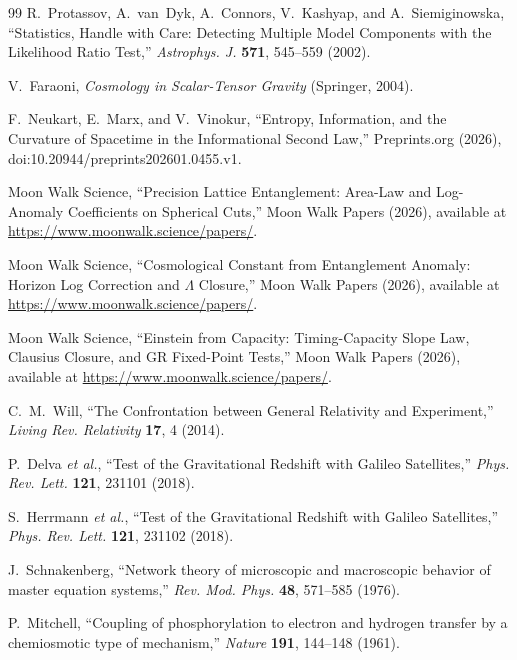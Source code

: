 \documentclass[10pt]{article}
\begin{document}
\begin{thebibliography}{99}
R.~Protassov, A.~van~Dyk, A.~Connors, V.~Kashyap, and A.~Siemiginowska,
``Statistics, Handle with Care: Detecting Multiple Model Components with the Likelihood Ratio Test,''
\emph{Astrophys. J.} \textbf{571}, 545--559 (2002).

V.~Faraoni,
\emph{Cosmology in Scalar-Tensor Gravity}
(Springer, 2004).

F.~Neukart, E.~Marx, and V.~Vinokur,
``Entropy, Information, and the Curvature of Spacetime in the Informational Second Law,''
Preprints.org (2026), doi:10.20944/preprints202601.0455.v1.

Moon Walk Science,
``Precision Lattice Entanglement: Area-Law and Log-Anomaly Coefficients on Spherical Cuts,''
Moon Walk Papers (2026), available at
\url{https://www.moonwalk.science/papers/}.

Moon Walk Science,
``Cosmological Constant from Entanglement Anomaly: Horizon Log Correction and \(\Lambda\) Closure,''
Moon Walk Papers (2026), available at
\url{https://www.moonwalk.science/papers/}.

Moon Walk Science,
``Einstein from Capacity: Timing-Capacity Slope Law, Clausius Closure, and GR Fixed-Point Tests,''
Moon Walk Papers (2026), available at
\url{https://www.moonwalk.science/papers/}.

C.~M.~Will,
``The Confrontation between General Relativity and Experiment,''
\emph{Living Rev. Relativity} \textbf{17}, 4 (2014).

P.~Delva \emph{et al.},
``Test of the Gravitational Redshift with Galileo Satellites,''
\emph{Phys. Rev. Lett.} \textbf{121}, 231101 (2018).

S.~Herrmann \emph{et al.},
``Test of the Gravitational Redshift with Galileo Satellites,''
\emph{Phys. Rev. Lett.} \textbf{121}, 231102 (2018).

J.~Schnakenberg,
``Network theory of microscopic and macroscopic behavior of master equation systems,''
\emph{Rev. Mod. Phys.} \textbf{48}, 571--585 (1976).

P.~Mitchell,
``Coupling of phosphorylation to electron and hydrogen transfer by a chemiosmotic type of mechanism,''
\emph{Nature} \textbf{191}, 144--148 (1961).


\end{thebibliography}
\end{document}
